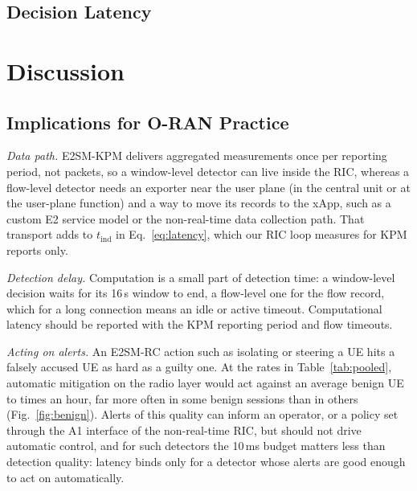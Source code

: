 \documentclass{ieeeaccess}
\begin{document}
\begin{table}[t]
\caption{Calibration over 10 splits. Left: largest absolute change in ROC-AUC per calibrator, over splits and both evaluation sets. Right: target balanced accuracy at $\tau=0.5$ for raw scores, Platt and isotonic calibration, and Platt followed by prior correction with the EM estimate or the published prior (oracle).}
\label{tab:calibration}
\centering
\footnotesize

\end{table}

\subsection{Decision Latency}
\label{sec:res:latency}



\section{Discussion}
\label{sec:discussion}

\subsection{Implications for O-RAN Practice}
\label{sec:disc:practice}

\emph{Data path.} E2SM-KPM delivers aggregated measurements once per reporting period, not packets, so a window-level detector can live inside the RIC, whereas a flow-level detector needs an exporter near the user plane (in the central unit or at the user-plane function) and a way to move its records to the xApp, such as a custom E2 service model or the non-real-time data collection path. That transport adds to $t_{\mathrm{ind}}$ in Eq.~\eqref{eq:latency}, which our RIC loop measures for KPM reports only.

\emph{Detection delay.} Computation is a small part of detection time: a window-level decision waits for its 16\,s window to end, a flow-level one for the flow record, which for a long connection means an idle or active timeout. Computational latency should be reported with the KPM reporting period and flow timeouts.

\emph{Acting on alerts.} An E2SM-RC action such as isolating or steering a UE hits a falsely accused UE as hard as a guilty one. At the rates in Table~\ref{tab:pooled}, automatic mitigation on the radio layer would act against an average benign UE \RadFAmin{} to \RadFAmax{} times an hour, far more often in some benign sessions than in others (Fig.~\ref{fig:benign}). Alerts of this quality can inform an operator, or a policy set through the A1 interface of the non-real-time RIC, but should not drive automatic control, and for such detectors the 10\,ms budget matters less than detection quality: latency binds only for a detector whose alerts are good enough to act on automatically.
\end{document}
